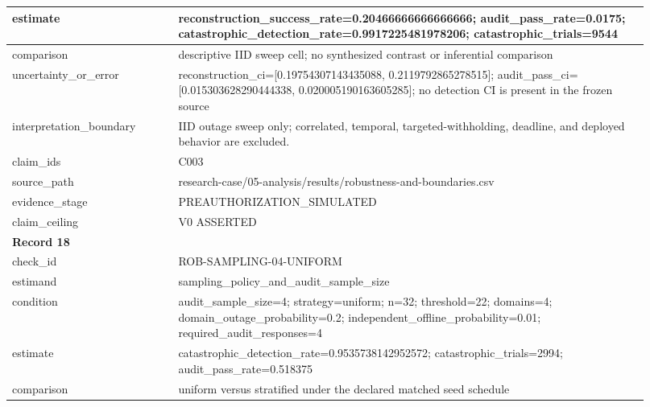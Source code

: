 \begin{longtable}{|p{0.24\linewidth}|p{0.68\linewidth}|}
estimate & reconstruction\_\allowbreak{}success\_\allowbreak{}rate=0.20466666666666666;\allowbreak{} audit\_\allowbreak{}pass\_\allowbreak{}rate=0.0175;\allowbreak{} catastrophic\_\allowbreak{}detection\_\allowbreak{}rate=0.9917225481978206;\allowbreak{} catastrophic\_\allowbreak{}trials=9544 \\ \hline
comparison & descriptive IID sweep cell;\allowbreak{} no synthesized contrast or inferential comparison \\ \hline
uncertainty\_\allowbreak{}or\_\allowbreak{}error & reconstruction\_\allowbreak{}ci=[0.19754307143435088, 0.2119792865278515];\allowbreak{} audit\_\allowbreak{}pass\_\allowbreak{}ci=[0.015303628290444338, 0.020005190163605285];\allowbreak{} no detection CI is present in the frozen source \\ \hline
interpretation\_\allowbreak{}boundary & IID outage sweep only;\allowbreak{} correlated, temporal, targeted-withholding, deadline, and deployed behavior are excluded. \\ \hline
claim\_\allowbreak{}ids & C003 \\ \hline
source\_\allowbreak{}path & research-case/05-analysis/results/robustness-and-boundaries.csv \\ \hline
evidence\_\allowbreak{}stage & PREAUTHORIZATION\_\allowbreak{}SIMULATED \\ \hline
claim\_\allowbreak{}ceiling & V0 ASSERTED \\ \hline
\multicolumn{2}{|l|}{\textbf{Record 18}} \\ \hline
check\_\allowbreak{}id & ROB-SAMPLING-04-UNIFORM \\ \hline
estimand & sampling\_\allowbreak{}policy\_\allowbreak{}and\_\allowbreak{}audit\_\allowbreak{}sample\_\allowbreak{}size \\ \hline
condition & audit\_\allowbreak{}sample\_\allowbreak{}size=4;\allowbreak{} strategy=uniform;\allowbreak{} n=32;\allowbreak{} threshold=22;\allowbreak{} domains=4;\allowbreak{} domain\_\allowbreak{}outage\_\allowbreak{}probability=0.2;\allowbreak{} independent\_\allowbreak{}offline\_\allowbreak{}probability=0.01;\allowbreak{} required\_\allowbreak{}audit\_\allowbreak{}responses=4 \\ \hline
estimate & catastrophic\_\allowbreak{}detection\_\allowbreak{}rate=0.9535738142952572;\allowbreak{} catastrophic\_\allowbreak{}trials=2994;\allowbreak{} audit\_\allowbreak{}pass\_\allowbreak{}rate=0.518375 \\ \hline
comparison & uniform versus stratified under the declared matched seed schedule \\ \hline

\end{longtable}
